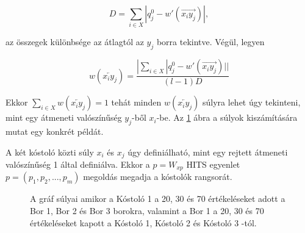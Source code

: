 \documentclass[12pt]{report}
\theoremstyle{definition}
\begin{document}
	\begin{equation} \label{CoHITS sum of diff}
	D=\sum_{i \in X}|q_j^0-w'\left(\overrightarrow{x_iy_j}\right)|,
	\end{equation}
	
	az összegek különbsége az átlagtól az $y_j$ borra tekintve. Végül, legyen
	
	\begin{equation} \label{CoHITS transition probability}
	w\left(\overleftarrow{x_iy_j}\right)=\dfrac{|\sum_{i \in X}|q_j^0-w'\left(\overrightarrow{x_iy_j}\right)||}{\left(l-1\right)D}
	\end{equation} 
	
	Ekkor $\sum_{i \in X}w\left(\overleftarrow{x_iy_j}\right)=1$ tehát minden $w\left(\overleftarrow{x_iy_j}\right)$ súlyra lehet úgy tekinteni, mint egy átmeneti valószínűség $y_j$-ből $x_i$-be. Az \ref{CoHITS gráf} ábra a súlyok kiszámítására mutat egy konkrét példát.
	
	A két kóstoló közti súly $x_i$ és $x_j$ úgy definiálható, mint egy rejtett átmeneti valószínűség 1 által definiálva. Ekkor a $p=W_{xp}$ HITS egyenlet  $p=\left(p_1,p_2,...,p_m\right)$ megoldás megadja a kóstolók rangsorát.
	
	\begin{figure}[!ht]
		\begin{center}
		\end{center}
		\caption{\label{CoHITS gráf} A gráf súlyai amikor a Kóstoló 1 a 20, 30 és 70 értékeléseket adott a Bor 1, Bor 2 és Bor 3 borokra, valamint a Bor 1 a 20, 30 és 70 értékeléseket kapott a Kóstoló 1, Kóstoló 2 és Kóstoló 3 -tól.}
	\end{figure}
	
\end{document}
